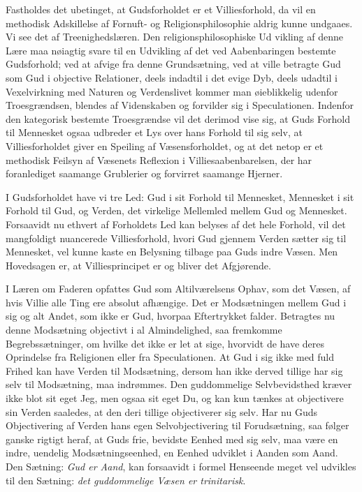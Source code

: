 \documentclass[12pt]{book}
\begin{document}
Fastholdes det ubetinget, at Gudsforholdet er et Villiesforhold, da
vil en methodisk Adskillelse af Fornuft- og Religionsphilosophie
aldrig kunne undgaaes. Vi see det af Treenighedslæren. Den
religionsphilosophiske Ud\-
vikling af denne Lære maa nøiagtig svare til en Udvikling af det ved
Aabenbaringen bestemte Gudsforhold; ved at afvige fra denne
Grundsætning, ved at ville betragte Gud som Gud i objective
Relationer, deels indadtil i det evige Dyb, deels udadtil i
Vexelvirkning med Naturen og Verdenslivet kommer man øieblikkelig
udenfor Troesgrændsen, blendes af Videnskaben og forvilder sig i
Speculationen. Indenfor den kategorisk bestemte Troesgrændse vil det
derimod vise sig, at Guds Forhold til Mennesket ogsaa udbreder et
Lys over hans Forhold til sig selv, at Villiesforholdet giver en
Speiling af Væsensforholdet, og at det netop er et methodisk Feilsyn
af Væsenets Reflexion i Villiesaabenbarelsen, der har foranlediget
saamange Grublerier og forvirret saamange Hjerner.

I Gudsforholdet have vi tre Led: Gud i sit Forhold til Mennesket,
Mennesket i sit Forhold til Gud, og Verden, det virkelige Mellemled
mellem Gud og Mennesket. Forsaavidt nu ethvert af Forholdets Led kan
belyses af det hele Forhold, vil det mangfoldigt nuancerede
Villiesforhold, hvori Gud gjennem Verden sætter sig til Mennesket,
vel kunne kaste en Belysning tilbage paa Guds indre Væsen. Men
Hovedsagen er, at Villiesprincipet er og bliver det Afgjørende.

I Læren om Faderen opfattes Gud som Altilværelsens Ophav, som det
Væsen, af hvis Villie alle Ting ere absolut afhængige. Det er
Modsætningen mellem Gud i sig og alt Andet, som ikke er Gud, hvorpaa
Eftertrykket falder. Betragtes nu denne Modsætning objectivt i al
Almindelighed, saa fremkomme Begrebssætninger, om hvilke det ikke er
let at sige, hvorvidt de have deres Oprindelse fra Religionen eller
fra Speculationen. At Gud i sig ikke med fuld Frihed kan have
Verden til Modsætning, dersom han ikke derved tillige har sig selv
til Modsætning, maa indrømmes. Den guddommelige Selvbevidsthed
kræver ikke blot sit eget Jeg, men ogsaa sit eget Du, og kan kun
tænkes at objectivere sin Verden saaledes, at den deri tillige
objectiverer sig selv. Har nu Guds Objectivering af Verden hans egen
Selvobjectivering til Forudsætning, saa følger ganske rigtigt heraf,
at Guds frie, bevidste Eenhed med sig selv, maa være en indre,
uendelig Modsætningseenhed, en Eenhed udviklet i Aanden som Aand.
Den Sætning: \emph{Gud er Aand}, kan forsaavidt i formel Henseende
meget vel udvikles til den Sætning: \emph{det guddommelige Væsen er
trinitarisk}.
\end{document}
